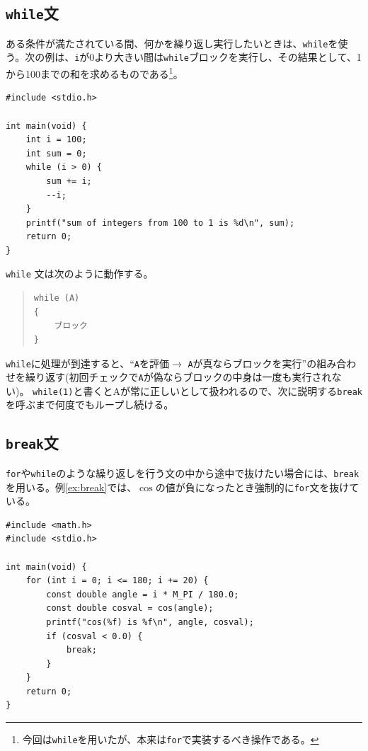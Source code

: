 \subsection{\texttt{while}文}
ある条件が満たされている間、何かを繰り返し実行したいときは、\texttt{while}を使う。次の例は、\texttt{i}が0より大きい間は\texttt{while}ブロックを実行し、その結果として、1から100までの和を求めるものである\footnote{今回は\texttt{while}を用いたが、本来は\texttt{for}で実装するべき操作である。}。
\begin{reidai}\label{ex:while}
\begin{verbatim}
#include <stdio.h>

int main(void) {
    int i = 100;
    int sum = 0;
    while (i > 0) {
        sum += i;
        --i;
    }
    printf("sum of integers from 100 to 1 is %d\n", sum);
    return 0;
}
\end{verbatim}
\end{reidai} \noindent
\texttt{while} 文は次のように動作する。
\begin{quote}
\begin{verbatim}
while (A)
{
    ブロック
}
\end{verbatim}
\end{quote}
\texttt{while}に処理が到達すると、``\texttt{A}を評価\(\rightarrow\) \texttt{A}が真ならブロックを実行''の組み合わせを繰り返す(初回チェックで\texttt{A}が偽ならブロックの中身は一度も実行されない)。
\texttt{while(1)}と書くとAが常に正しいとして扱われるので、次に説明する\texttt{break}を呼ぶまで何度でもループし続ける。

\subsection{\texttt{break}文}
\texttt{for}や\texttt{while}のような繰り返しを行う文の中から途中で抜けたい場合には、\texttt{break}を用いる。例\ref{ex:break}では、\(\cos\)の値が負になったとき強制的に\texttt{for}文を抜けている。
\begin{reidai}\label{ex:break}
    \begin{verbatim}
#include <math.h>
#include <stdio.h>

int main(void) {
    for (int i = 0; i <= 180; i += 20) {
        const double angle = i * M_PI / 180.0;
        const double cosval = cos(angle);
        printf("cos(%f) is %f\n", angle, cosval);
        if (cosval < 0.0) {
            break;
        }
    }
    return 0;
}
\end{verbatim}
\end{reidai}

